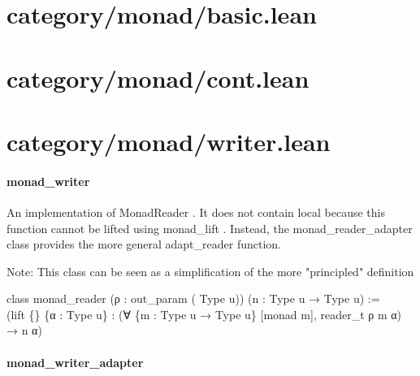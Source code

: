 \documentclass{article}
\begin{document}
\section{category/monad/basic.lean}\section{category/monad/cont.lean}\section{category/monad/writer.lean}\paragraph{monad\_writer}
\par
An implementation of 
\href{https://hackage.haskell.org/package/mtl-2.2.2/docs/Control-Monad-Reader-Class.html#t:MonadReader}{}MonadReader
.
It does not contain 
\colorbox[RGB]{253,246,227}{{{{\color[RGB]{133, 153, 0} local }}}} because this function cannot be lifted using 
\colorbox[RGB]{253,246,227}{{{{\color[RGB]{101, 123, 131} monad\_lift }}}}.
Instead, the 
\colorbox[RGB]{253,246,227}{{{{\color[RGB]{101, 123, 131} monad\_reader\_adapter }}}} class provides the more general 
\colorbox[RGB]{253,246,227}{{{{\color[RGB]{101, 123, 131} adapt\_reader }}}} function.
\par
Note: This class can be seen as a simplification of the more "principled" definition
\\
\colorbox[RGB]{253,246,227}{\parbox{4.5in}{{{{\color[RGB]{133, 153, 0} class }}}{{{\color[RGB]{101, 123, 131}   }}}{{{\color[RGB]{211, 54, 130} monad\_reader }}}{{{\color[RGB]{101, 123, 131}   }}}{{{\color[RGB]{101, 123, 131} (ρ : out\_param ( }}}{{{\color[RGB]{38, 139, 210} Type }}}{{{\color[RGB]{101, 123, 131}  u)) (n :  }}}{{{\color[RGB]{38, 139, 210} Type }}}{{{\color[RGB]{101, 123, 131}  u  }}}{{{\color[RGB]{133, 153, 0} → }}}{{{\color[RGB]{101, 123, 131}   }}}{{{\color[RGB]{38, 139, 210} Type }}}{{{\color[RGB]{101, 123, 131}  u)  }}}{{{\color[RGB]{181, 137, 0} := }}}{{{\color[RGB]{101, 123, 131} 
 }}}\\

{{{\color[RGB]{101, 123, 131} (lift \{\} \{α :  }}}{{{\color[RGB]{38, 139, 210} Type }}}{{{\color[RGB]{101, 123, 131}  u\} : (∀ \{m :  }}}{{{\color[RGB]{38, 139, 210} Type }}}{{{\color[RGB]{101, 123, 131}  u  }}}{{{\color[RGB]{133, 153, 0} → }}}{{{\color[RGB]{101, 123, 131}   }}}{{{\color[RGB]{38, 139, 210} Type }}}{{{\color[RGB]{101, 123, 131}  u\} {[}monad m{]}, reader\_t ρ m α)  }}}{{{\color[RGB]{133, 153, 0} → }}}{{{\color[RGB]{101, 123, 131}  n α)
 }}}\\

}}\paragraph{monad\_writer\_adapter}
\end{document}
